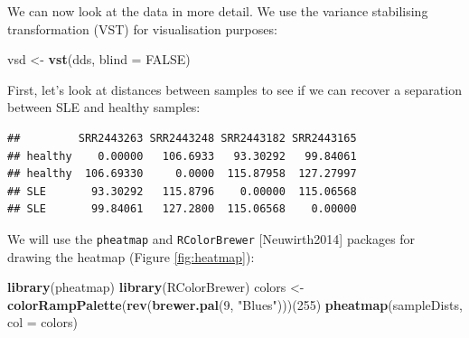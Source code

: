 \documentclass[9pt,a4paper,]{extarticle}
\newenvironment{Shaded}{\begin{snugshade}}{\end{snugshade}}
\newcommand{\KeywordTok}[1]{\textcolor[rgb]{0.13,0.29,0.53}{\textbf{#1}}}
\newcommand{\DataTypeTok}[1]{\textcolor[rgb]{0.13,0.29,0.53}{#1}}
\newcommand{\DecValTok}[1]{\textcolor[rgb]{0.00,0.00,0.81}{#1}}
\newcommand{\StringTok}[1]{\textcolor[rgb]{0.31,0.60,0.02}{#1}}
\newcommand{\OtherTok}[1]{\textcolor[rgb]{0.56,0.35,0.01}{#1}}
\newcommand{\OperatorTok}[1]{\textcolor[rgb]{0.81,0.36,0.00}{\textbf{#1}}}
\newcommand{\NormalTok}[1]{#1}
\begin{document}
We can now look at the data in more detail.
We use the variance stabilising transformation (VST) \citep{Anders2010} for visualisation purposes:

\begin{Shaded}
\begin{Highlighting}[]
\NormalTok{vsd <-}\StringTok{ }\KeywordTok{vst}\NormalTok{(dds, }\DataTypeTok{blind =} \OtherTok{FALSE}\NormalTok{)}
\end{Highlighting}
\end{Shaded}

First, let's look at distances between samples to see if we can recover a separation between SLE and healthy samples:

\begin{Shaded}
\end{Shaded}

\begin{verbatim}
##         SRR2443263 SRR2443248 SRR2443182 SRR2443165
## healthy    0.00000   106.6933   93.30292   99.84061
## healthy  106.69330     0.0000  115.87958  127.27997
## SLE       93.30292   115.8796    0.00000  115.06568
## SLE       99.84061   127.2800  115.06568    0.00000
\end{verbatim}

We will use the \texttt{pheatmap} \citep{Kolde2015} and \texttt{RColorBrewer} {[}Neuwirth2014{]} packages for drawing the heatmap (Figure \ref{fig:heatmap}):

\begin{Shaded}
\begin{Highlighting}[]
\KeywordTok{library}\NormalTok{(pheatmap)}
\KeywordTok{library}\NormalTok{(RColorBrewer)}
\NormalTok{colors <-}\StringTok{ }\KeywordTok{colorRampPalette}\NormalTok{(}\KeywordTok{rev}\NormalTok{(}\KeywordTok{brewer.pal}\NormalTok{(}\DecValTok{9}\NormalTok{, }\StringTok{"Blues"}\NormalTok{)))(}\DecValTok{255}\NormalTok{)}
\KeywordTok{pheatmap}\NormalTok{(sampleDists, }\DataTypeTok{col =}\NormalTok{ colors)}
\end{Highlighting}
\end{Shaded}
\end{document}
